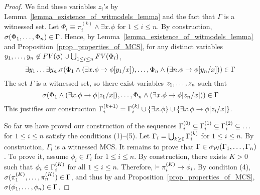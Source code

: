\documentclass{amsart}
\begin{document}
\begin{proof}
We find these variables $z_i$'s
by Lemma~\ref{lemma_existence_of_witmodels_lemma}
and the fact that $\Gamma$ is a witnessed set.
Let
$\Phi_i \equiv \pi_i^{(k)} \wedge  \exists x . \phi$
for $1 \le i \le n$.
By construction,
$\sigma(\Phi_1,\dots,\Phi_n) \in \Gamma$.
Hence,
by Lemma~\ref{lemma_existence_of_witmodels_lemma}
and Proposition~\ref{prop_properties_of_MCS},
for any distinct variables 
$y_1 ,\dots, y_n \not\in
\mathit{FV}(\phi)\cup
\bigcup_{1 \le i \le n} 
\mathit{FV}(\Phi_i) 
$,
$$
\exists y_1 \dots \exists y_n .
\sigma(
\Phi_1 \wedge (\exists x . \phi \to \phi[y_1/x])
,\dots,
\Phi_n \wedge (\exists n . \phi \to \phi[y_n/x])
) \in \Gamma
$$
The set $\Gamma$ is a witnessed set, 
so there exist variables $z_1 ,\dots, z_n$ such that
$$
\sigma(
\Phi_1
\wedge (\exists x . \phi \to \phi[z_1/x])
,\dots,
\Phi_n
\wedge (\exists x . \phi \to \phi[z_n/x])
) \in \Gamma
$$
This justifies our construction
$\Gamma_i^{(k+1)} = \Gamma_i^{(k)} 
\cup \{ \exists x . \phi \}
\cup \{ \exists x . \phi \to \phi[z_i/x] \}
$.

So far we have proved our construction
of the sequences
$\Gamma_i^{(0)} \subseteq \Gamma_i^{(1)} \subseteq \Gamma_i^{(2)} \subseteq \dots$ 
for $1 \le i \le n$
satisfy the conditions (1)--(5).
Let $\Gamma_i = \bigcup_{k \ge 0} \Gamma_i^{(k)}$ for $1 \le i \le n$.
By construction, $\Gamma_i$ is a witnessed MCS.
It remains to prove that
$\Gamma \in \sigma_{\mathcal{W}}(\Gamma_1 ,\dots, \Gamma_n)$.
To prove it, assume
$\phi_i \in \Gamma_i$ for $1 \le i \le n$.
By construction, there exists $K > 0$ such that
$\phi_i \in \Gamma_i^{(K)}$ for all $1 \le i \le n$.
Therefore, $\vdash \pi_i^{(K)} \to \phi_i$.
By condition (4), 
$\sigma(\pi_1^{(K)} ,\dots, \pi_n^{(K)}) \in \Gamma$,
and thus by \framing and Proposition~\ref{prop_properties_of_MCS},
$\sigma(\phi_1 ,\dots, \phi_n) \in \Gamma$.
\end{proof}
\end{document}
